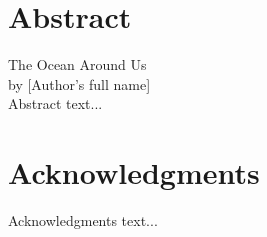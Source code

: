 \documentclass[12pt,letterpaper]{report}
\title{\mytitle}
\author{May B. Credible}
\newcommand{\mytitle}{The Ocean Around Us}
\begin{document}
\pagestyle{plain}






\setcounter{page}{3}
\chapter*{Abstract}
\mytitle \\

\noindent
by [Author's full name] \\


\noindent
Abstract text...


\chapter*{Acknowledgments}
Acknowledgments text...


\tableofcontents
\pagebreak
{}\listoffigures 
\pagebreak
{}\listoftables


\pagestyle{myheadings}


%
%
%
%






\pagebreak
{} 
 




 
\end{document}
